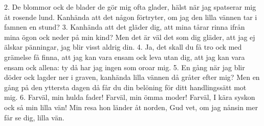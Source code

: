 2.  De blommor ock de blader de gör mig ofta glader,
    hälst när jag spatserar mig åt rosende lund.
    Kanhända att det någon förtryter,
    om jag den lilla vännen tar i famnen en stund?
3.  Kanhända att det gläder dig, att mina tårar rinna
    ifrån mina ögon ock neder på min kind?
    Men det är väl det som dig gläder,
    att jag ej älskar pänningar, jag blir visst aldrig din.
4.  Ja, det skall du få tro ock med grämelse få finna,
    att jag kan vara ensam ock leva utan dig,
    att jag kan vara ensam ock allena:
    ty då har jag ingen som oroar mig.
5.  En gång när jag blir döder ock lagder ner i graven,
    kanhända lilla vännen då gråter efter mig?
    Men en gång på den yttersta dagen
    då får du din belöning för ditt handlingssätt mot mig.
6.  Farväl, min hulda fader! Farväl, min ömma moder!
    Farväl, I kära syskon ock så min lilla vän!
    Min resa hon länder åt norden,
    Gud vet, om jag nånsin mer får se dig, lilla vän.
